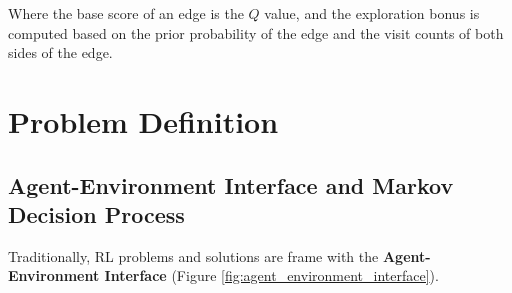 \documentclass[12pt]{article}
\newcommand{\note}[1]{\todo[color=yellow!40,bordercolor=none,linecolor=black]{#1}}
\begin{document}
Where the base score of an edge is the $Q$ value, and the exploration bonus is computed based on the prior probability of the edge and the visit counts of both sides of the edge.








\section{Problem Definition}
\note{(5 pages)}

\subsection{Agent-Environment Interface and Markov Decision Process}
Traditionally, RL problems and solutions are frame with the \textbf{Agent-Environment Interface} (Figure \ref{fig:agent_environment_interface}).
\end{document}
